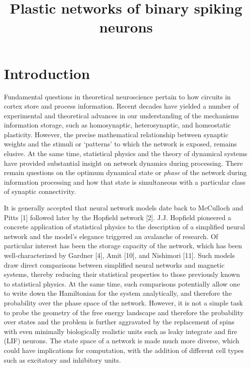 \documentclass{article} %
\title{Plastic networks of binary spiking neurons}
\begin{document}
\maketitle

\section{Introduction}

Fundamental questions in theoretical neuroscience pertain to how circuits in cortex store and process information. Recent decades have yielded a number of experimental and theoretical advances in our understanding of the mechanisms information storage, such as homosynaptic, heterosynaptic, and homeostatic plasticity. However, the precise mathematical relationship between synaptic weights and the stimuli or `patterns' to which the network is exposed, remains elusive. At the same time, statistical physics and the theory of dynamical systems have provided substantial insight on network dynamics during processing. There remain questions on the optimum dynamical state or \emph{phase} of the network during information processing and how that state is simultaneous with a particular class of synaptic connectivity. 


It is generally accepted that neural network models date back to McCulloch and Pitts [1] followed later by the Hopfield network [2]. J.J. Hopfield pioneered a concrete application of statistical physics to the description of a simplified neural network and the model's elegance triggered an avalanche of research. Of particular interest has been the storage capacity of the network, which has been well-characterized by Gardner [4], Amit [10], and Nishimori [11]. Such models draw direct comparisons between simplified neural networks and magnetic systems, thereby reducing their statistical properties to those previously known to statistical physics. At the same time, such comparisons potentially allow one to write down the Hamiltonian for the system analytically, and therefore the probability over the phase space of the network. However, it is not a simple task to probe the geometry of the free energy landscape and therefore the probability over states and the problem is further aggravated by the replacement of spins with even minimally biologically realistic units such as leaky integrate and fire (LIF) neurons. The state space of a network is made much more diverse, which could have implications for computation, with the addition of different cell types such as excitatory and inhibitory units. 
\end{document}
